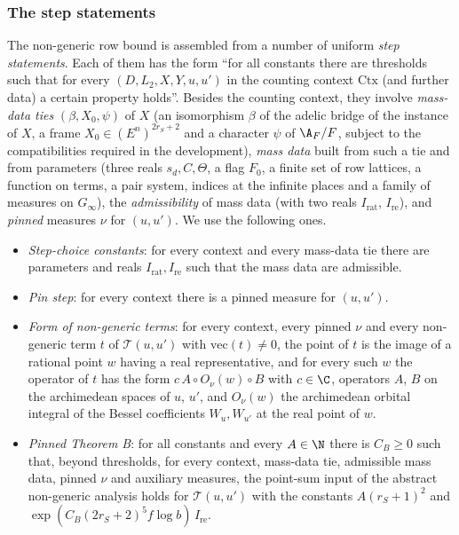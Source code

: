 \subsubsection{The step statements}

The non-generic row bound is assembled from a number of uniform \emph{step statements}. Each of them has the form
``for all constants there are thresholds such that for every $(D,L_2,X,Y,u,u')$ in the counting context
$\mathrm{Ctx}$ (and further data) a certain property holds''. Besides the counting context, they involve
\emph{mass-data ties} $(\beta,X_0,\psi)$ of $X$ (an isomorphism $\beta$ of the adelic bridge of the instance of $X$,
a frame $X_0\in(E^n)^{2r_S+2}$ and a character $\psi$ of $\A_F/F$, subject to the compatibilities required in
the development), \emph{mass data} built from such a tie and from parameters (three reals $s_d,C,\Theta$, a
flag $F_0$, a finite set of row lattices, a function on terms, a pair system, indices at the infinite places and
a family of measures on $G_\infty$), the \emph{admissibility} of mass data (with two reals $I_{\mathrm{rat}}$,
$I_{\mathrm{re}}$), and \emph{pinned} measures $\nu$ for $(u,u')$. We use the following ones.

\begin{definition}\label{pf:sh-flag:defsteps}
\begin{itemize}
\item[$(\mathrm{SC})$] \emph{Step-choice constants}: for every context and every mass-data tie there are
parameters and reals $I_{\mathrm{rat}},I_{\mathrm{re}}$ such that the mass data are admissible.
\item[$(\mathrm{PE})$] \emph{Pin step}: for every context there is a pinned measure for $(u,u')$.
\item[$(\mathrm{FN})$] \emph{Form of non-generic terms}: for every context, every pinned $\nu$ and every non-generic
term $t$ of $\mathcal T(u,u')$ with $\mathrm{vec}(t)\ne0$, the point of $t$ is the image of a rational point $w$
having a real representative, and for every such $w$ the operator of $t$ has the form $c\,A\circ O_\nu(w)\circ B$
with $c\in\C$, operators $A$, $B$ on the archimedean spaces of $u$, $u'$, and $O_\nu(w)$ the archimedean orbital
integral of the Bessel coefficients $W_u,W_{u'}$ at the real point of $w$.
\item[$(\mathrm{TB})$] \emph{Pinned Theorem B}: for all constants and every $A\in\N$ there is $C_B\ge0$ such that,
beyond thresholds, for every context, mass-data tie, admissible mass data, pinned $\nu$ and auxiliary
measures, the point-sum input of the abstract non-generic analysis holds for $\mathcal T(u,u')$ with the
constants $A(r_S+1)^2$ and $\exp(C_B(2r_S+2)^5f\log b)\,I_{\mathrm{re}}$.
\end{itemize}
\ \
\ 
\end{definition}

